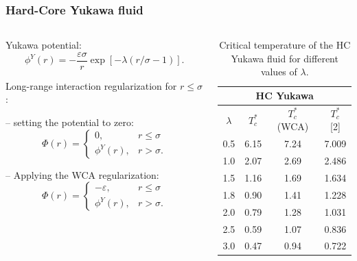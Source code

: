 \documentclass[8pt]{beamer}
\begin{document}
	\begin{frame}
		\frametitle{Hard-Core Yukawa fluid}
		
		\begin{columns}
			\begin{column}{0.5\textwidth}
				Yukawa potential:
				\begin{equation*}
					\label{def:yukawa}
					\phi^Y(r) = -\frac{\varepsilon \sigma}{r} \exp[-\lambda(r/\sigma - 1)].
				\end{equation*}
				
				Long-range interaction regularization for $r \leq \sigma$:
				\hfill
				\\
				\hfill
				
				-- setting the potential to zero:
				\begin{equation*}
					\Phi(r) = \left\{
					\begin{array}{ll}
						0, & r \leq \sigma 
						\\
						\phi^Y(r), & r > \sigma.
					\end{array}
					\right.
				\end{equation*}
				
				-- Applying the WCA regularization:
				\begin{equation*}
					\Phi(r) = \left\{
					\begin{array}{ll}
						-\varepsilon, & r \leq \sigma 
						\\
						\phi^Y(r), & r > \sigma.
					\end{array}
					\right.
				\end{equation*}
			\end{column}
			
			\begin{column}{0.5\textwidth}
				
				\begin{table}[h]
					\noindent\caption{Critical temperature of the HC Yukawa fluid for different values of $\lambda$.}\vskip3mm
					\begin{tabular}{|c|c|c|c|}
						\hline
						\multicolumn{4}{|c|}{HC Yukawa}\\
						\hline
						$\lambda$ & $T_c^*$ & $T_c^*$ (WCA)& $T_c^*$ [2] \\
						\hline
						0.5 & 6.15 & 7.24 & 7.009 \\
						1.0 & 2.07 & 2.69 & 2.486 \\
						1.5 & 1.16 & 1.69 & 1.634 \\
						1.8 & 0.90 & 1.41 & 1.228 \\
						2.0 & 0.79 & 1.28 & 1.031 \\
						2.5 & 0.59 & 1.07 & 0.836 \\
						3.0 & 0.47 & 0.94 & 0.722 \\
						\hline
					\end{tabular}
					\label{tab:yukawa_temp_cr}
				\end{table}
				

\end{column}
\end{columns}
\end{frame}
\end{document}

